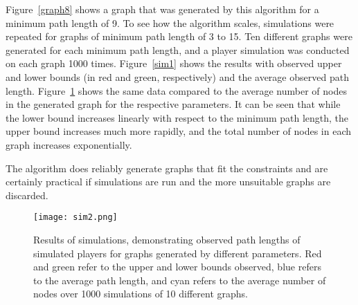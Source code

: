 \documentclass[landscape, a0, final]{a0poster}
\begin{document}
\begin{minipage}{0.25\linewidth}
\begin{minipage}{0.9\linewidth}
Figure~\ref{graph8} shows a graph that was generated by this algorithm for a minimum path length of 9.  To see how the algorithm scales, simulations were repeated for graphs of minimum path length of 3 to 15.  Ten different graphs were generated for each minimum path length, and a player simulation was conducted on each graph 1000 times.  Figure~\ref{sim1} shows the results with observed upper and lower bounds (in red and green, respectively) and the average observed path length.  Figure~\ref{sim2} shows the same data compared to the average number of nodes in the generated graph for the respective parameters.  It can be seen that while the lower bound increases linearly with respect to the minimum path length, the upper bound increases much more rapidly, and the total number of nodes in each graph increases exponentially.

The algorithm does reliably generate graphs that fit the constraints and are certainly practical if simulations are run and the more unsuitable graphs are discarded.

\centering 
    \begin{figure}[H]
        \texttt{[image: sim2.png]} 
            \caption{Results of simulations, demonstrating observed path lengths of simulated players for graphs generated by different parameters.  Red and green refer to the upper and lower bounds observed, blue refers to the average path length, and cyan refers to the average number of nodes over 1000 simulations of 10 different graphs.} 
            \label{sim2}
    \end{figure}


\end{minipage} %
\end{minipage} %
\end{document}
